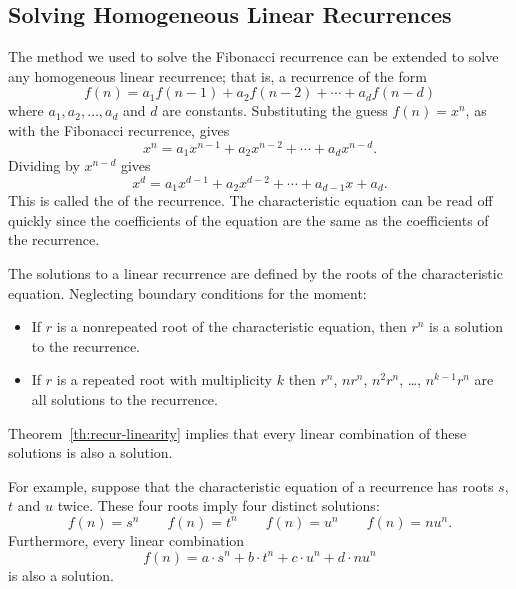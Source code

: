 \subsection{Solving Homogeneous Linear Recurrences}

The method we used to solve the Fibonacci recurrence can be extended
to solve any homogeneous linear recurrence; that is, a recurrence of
the form
\[
f(n) = a_1 f(n-1) + a_2 f(n-2) + \cdots + a_d f(n - d)
\]
where $a_1, a_2, \dots, a_d$ and $d$ are constants.  Substituting the
guess $f(n) = x^n$, as with the Fibonacci recurrence, gives
\[
   x^n = a_1x^{n-1} +a_2x^{n-2} + \cdots +a_dx^{n-d}.
\]
Dividing by $x^{n-d}$ gives
\[
x^d = a_1x^{d-1} + a_2x^{d-2} + \cdots+a_{d-1}x+a_d.
\]
This is called the  of the
recurrence.  The characteristic equation can be read off quickly
since the coefficients of the equation are the same as the
coefficients of the recurrence.

The solutions to a linear recurrence are defined by the roots of the
characteristic equation.  Neglecting boundary conditions for the
moment:
\begin{itemize}
\item If $r$ is a nonrepeated root of the characteristic equation,
  then $r^n$ is a solution to the recurrence.
\item If $r$ is a repeated root with multiplicity $k$ then $r^n$,
  $nr^n$, $n^2r^n$, \dots, $n^{k-1}r^n$ are all solutions to the
  recurrence.
\end{itemize}
Theorem~\ref{th:recur-linearity} implies that every linear
  combination of these solutions is also a solution.

For example, suppose that the characteristic equation of a
recurrence has roots $s$, $t$ and $u$ twice.  These four roots
imply four distinct solutions:
\[
f(n) = s^n \qquad f(n) = t^n \qquad f(n) = u^n \qquad f(n)
  = nu^n.
\]
Furthermore, every linear combination
\begin{equation}
f(n) = a \cdot s^n + b \cdot t^n + c \cdot u^n +d \cdot nu^n
\end{equation}
is also a solution.


